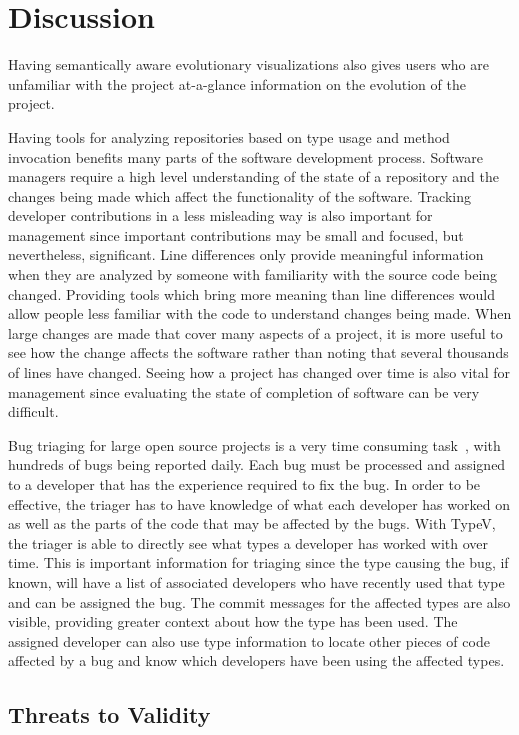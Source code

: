 \section{Discussion}

Having semantically aware evolutionary visualizations also gives users who are unfamiliar with the project at-a-glance information on the evolution of the project.

Having tools for analyzing repositories based on type usage and method invocation benefits many parts of the software development process. Software managers require a high level understanding of the state of a repository and the changes being made which affect the functionality of the software. Tracking developer contributions in a less misleading way is also important for management since important contributions may be small and focused, but nevertheless, significant. Line differences only provide meaningful information when they are analyzed by someone with familiarity with the source code being changed. Providing tools which bring more meaning than line differences would allow people less familiar with the code to understand changes being made. When large changes are made that cover many aspects of a project, it is more useful to see how the change affects the software rather than noting that several thousands of lines have changed. Seeing how a project has changed over time is also vital for management since evaluating the state of completion of software can be very difficult.

Bug triaging for large open source projects is a very time consuming task~\cite{badashian2015}, with hundreds  of bugs being reported daily. Each bug must be processed and assigned to a developer that has the experience required to fix the bug. In order to be effective, the triager has to have knowledge of what each developer has worked on as well as the parts of the code that may be affected by the bugs. With TypeV, the triager is able to directly see what types a developer has worked with over time. This is important information for triaging since the type causing the bug, if known, will have a list of associated developers who have recently used that type and can be assigned the bug. The commit messages for the affected types are also visible, providing greater context about how the type has been used. The assigned developer can also use type information to locate other pieces of code affected by a bug and know which developers have been using the affected types.

\subsection{Threats to Validity}

